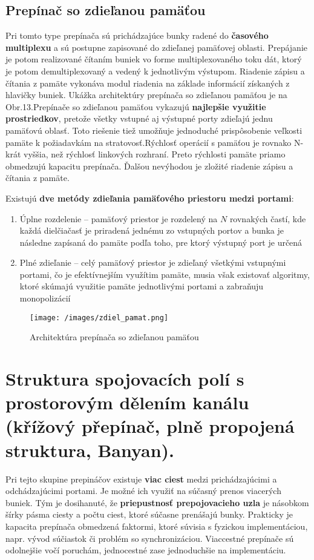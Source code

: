 \newpage
\subsection{Prepínač so zdieľanou pamäťou}
Pri tomto type prepínača sú prichádzajúce bunky radené do \textbf{časového multiplexu} a sú postupne zapisované do zdieľanej pamäťovej oblasti. Prepájanie je potom realizované čítaním buniek vo forme multiplexovaného toku dát, ktorý je potom demultiplexovaný a vedený k jednotlivým výstupom. Riadenie zápisu a čítania z pamäte vykonáva modul riadenia na základe informácií získaných z hlavičky buniek. Ukážka architektúry prepínača so zdieľanou pamäťou je na Obr.13.Prepínače so zdieľanou pamäťou vykazujú \textbf{najlepšie využitie prostriedkov}, pretože všetky vstupné aj výstupné porty zdieľajú jednu pamäťovú oblasť. Toto riešenie tiež umožňuje jednoduché prispôsobenie veľkosti pamäte k požiadavkám na stratovosť.Rýchlosť operácií s pamäťou je rovnako N-krát vyššia, než rýchlosť linkových rozhraní. Preto rýchlosti pamäte priamo obmedzujú kapacitu prepínača. Ďalšou nevýhodou je zložité riadenie zápisu a čítania z pamäte.\newline


Existujú \textbf{dve metódy zdieľania pamäťového priestoru medzi portami}:
\begin{enumerate}
    \item Úplne rozdelenie -- pamäťový priestor je rozdelený na $N$ rovnakých častí, kde každá dielčiačasť je priradená jednému zo vstupných portov a bunka je následne zapísaná do pamäte podľa toho, pre ktorý výstupný port je určená
    \item Plné zdieľanie -- celý pamäťový priestor je zdieľaný všetkými vstupnými portami, čo je efektívnejším využítim pamäte, musia však existovať algoritmy, ktoré skúmajú využitie pamäte jednotlivými portami a zabraňuju monopolizácií
\end{enumerate}

\begin{figure}[ht]
\centering
  \begin{center}
    \texttt{[image: /images/zdiel\_pamat.png]}
  \end{center}
  \caption[Architektúra prepínača so zdieľanou pamäťou]{Architektúra prepínača so zdieľanou pamäťou}
\end{figure}

\newpage
\section{Struktura spojovacích polí s prostorovým dělením kanálu (křížový přepínač, plně propojená struktura, Banyan).}
Pri tejto skupine prepináčov existuje \textbf{viac ciest} medzi prichádzajúcimi a odchádzajúcimi portami. Je možné ich využiť na súčasný prenos viacerých buniek. Tým je dosihanuté, že \textbf{priepustnosť prepojovacieho uzla} je násobkom šírky pásma ciesty a počtu ciest, ktoré súčasne prenášajú bunky. Prakticky je kapacita prepínača obmedzená faktormi, ktoré súvisia s fyzickou implementáciou, napr. vývod súčiastok či problém so synchronizáciou. Viaccestné prepínače sú odolnejšie vočí poruchám, jednocestné zase jednoduchšie na implementáciu.

